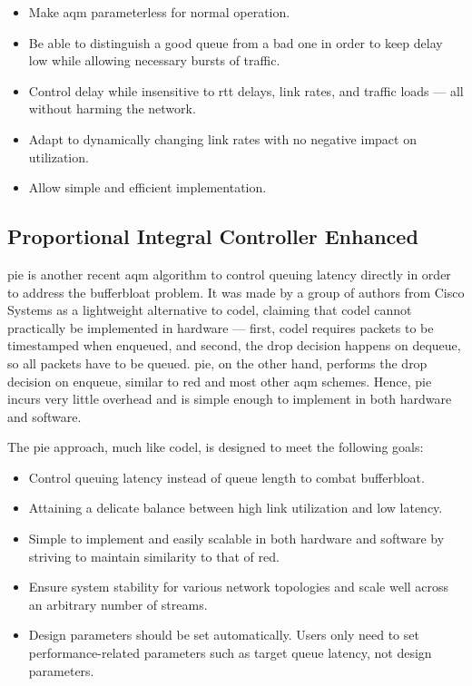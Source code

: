 \begin{itemize}
    \item Make \gls{aqm} parameterless for normal operation.
    \item Be able to distinguish a good queue from a bad one in order to keep delay low while allowing necessary bursts of traffic.
    \item Control delay while insensitive to \gls{rtt} delays, link rates, and traffic loads --- all without harming the network.
    \item Adapt to dynamically changing link rates with no negative impact on utilization.
    \item Allow simple and efficient implementation.
\end{itemize}




\subsection{Proportional Integral Controller Enhanced}

\gls{pie} is another recent \gls{aqm} algorithm to control queuing latency directly in order to address the bufferbloat problem. It was made by a group of authors from Cisco Systems as a lightweight alternative to \gls{codel}, claiming that \gls{codel} cannot practically be implemented in hardware --- first, \gls{codel} requires packets to be timestamped when enqueued, and second, the drop decision happens on dequeue, so all packets have to be queued. \gls{pie}, on the other hand, performs the drop decision on enqueue, similar to \gls{red} and most other \gls{aqm} schemes. Hence, \gls{pie} incurs very little overhead and is simple enough to implement in both hardware and software.

The \gls{pie} approach, much like \gls{codel}, is designed to meet the following goals: \cite{rfc8033}

\begin{itemize}
    \item Control queuing latency instead of queue length to combat bufferbloat.
    \item Attaining a delicate balance between high link utilization and low latency.
    \item Simple to implement and easily scalable in both hardware and software by striving to maintain similarity to that of \gls{red}.
    \item Ensure system stability for various network topologies and scale well across an arbitrary number of streams.
    \item Design parameters should be set automatically. Users only need to set performance-related parameters such as target queue latency, not design parameters.
\end{itemize}







